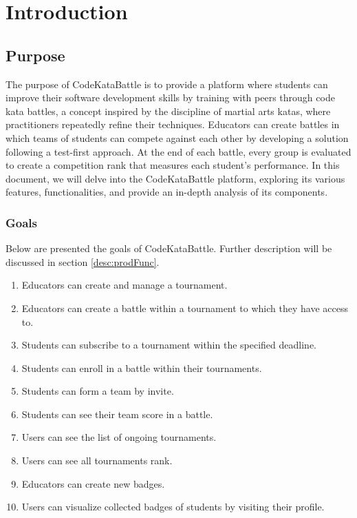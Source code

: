 \chapter{Introduction}

\section{Purpose}
The purpose of CodeKataBattle is to provide a platform where students can improve their software development skills by training with peers through code kata battles, a concept inspired by the discipline of martial arts katas, where practitioners repeatedly refine their techniques.
Educators can create battles in which teams of students can compete against each other by developing a solution following a test-first approach.
At the end of each battle, every group is evaluated to create a competition rank that measures each student's performance.
In this document, we will delve into the CodeKataBattle platform, exploring its various features, functionalities, and provide an in-depth analysis of its components.


\subsection{Goals}
Below are presented the goals of CodeKataBattle. Further description will be discussed in section \ref{desc:prodFunc}.
\begin{enumerate}[label=\textbf{G.\arabic*}]
	\item {} {Educators can create and manage a tournament.}
        \item {} {Educators can create a battle within a tournament to which they have access to.}
        \item {} {Students can subscribe to a tournament within the specified deadline.}
        \item {} {Students can enroll in a battle within their tournaments.}
        \item {} {Students can form a team by invite.}
        \item {} {Students can see their team score in a battle.}
        \item {} {Users can see the list of ongoing tournaments.}
        \item {} {Users can see all tournaments rank.}
        \item {} {Educators can create new badges.}
        \item {} {Users can visualize collected badges of students by visiting their profile.}
\end{enumerate}

